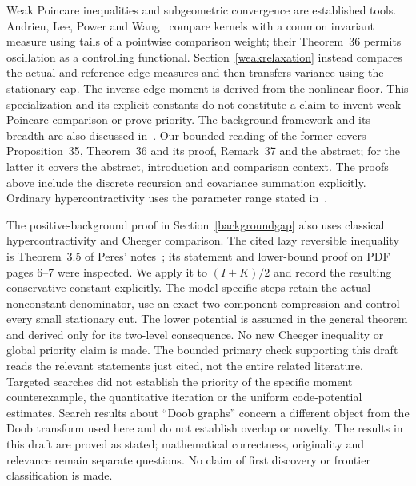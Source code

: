 \documentclass[11pt]{article}
\begin{document}
Weak Poincare inequalities and subgeometric convergence are established tools.
Andrieu, Lee, Power and Wang~\cite{alpw2022} compare kernels with a common
invariant measure using tails of a pointwise comparison weight; their
Theorem~36 permits oscillation as a controlling functional. Section~\ref{weakrelaxation}
instead compares the actual and reference edge measures and then transfers
variance using the stationary cap. The inverse edge moment is derived from
the nonlinear floor. This specialization and its explicit constants do not
constitute a claim to invent weak Poincare comparison or prove priority.
The background framework and its breadth are also discussed in~\cite{alpw2023}.
Our bounded reading of the former covers Proposition~35, Theorem~36 and its
proof, Remark~37 and the abstract; for the latter it covers the abstract,
introduction and comparison context. The proofs above include the discrete
recursion and covariance summation explicitly. Ordinary hypercontractivity
uses the parameter range stated in~\cite{odonnelllecture}.

The positive-background proof in Section~\ref{backgroundgap} also uses classical hypercontractivity and Cheeger comparison. The cited lazy reversible inequality is Theorem~3.5 of Peres' notes~\cite{peres}; its statement and lower-bound proof on PDF pages 6--7 were inspected. We apply it to $(I+K)/2$ and record the resulting conservative constant explicitly. The model-specific steps retain the actual nonconstant denominator, use an exact two-component compression and control every small stationary cut. The lower potential is assumed in the general theorem and derived only for its two-level consequence. No new Cheeger inequality or global priority claim is made. The bounded primary check supporting this draft reads the relevant statements just cited, not the entire related literature. Targeted searches did not establish the priority of the specific moment counterexample, the quantitative iteration or the uniform code-potential estimates. Search results about ``Doob graphs'' concern a different object from the Doob transform used here and do not establish overlap or novelty. The results in this draft are proved as stated; mathematical correctness, originality and relevance remain separate questions. No claim of first discovery or frontier classification is made.
\end{document}
